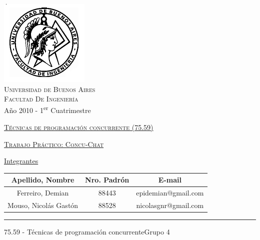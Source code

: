 \documentclass[12pt,titlepage]{article}
\begin{document}
\begin{titlepage}

\thispagestyle{empty}

\begin{center}
\includegraphics[scale=0.55]{./Images/fiuba}\\
\large{\textsc{Universidad de Buenos Aires}}\\
\large{\textsc{Facultad De Ingeniería}}\\
\small{Año 2010 - 1\textsuperscript{er} Cuatrimestre}
\end{center}

\vfill

\begin{center}

\Large{\underline{\textsc{Técnicas de programación concurrente (75.59)}}}

\vfill


\Large{\underline{\textsc{Trabajo Práctico: Concu-Chat}}}

\vfill
 
\Large\underline{Integrantes} \linebreak\linebreak

\large\addtolength{\tabcolsep}{-3pt}
\begin{tabular}{|| c | c | c ||}
\hline
\textbf{Apellido, Nombre} & \textbf{Nro. Padrón} & \textbf{E-mail} \\
\hline
Ferreiro, Demian & 88443 & epidemian@gmail.com \\
\hline
Mouso, Nicolás Gastón & 88528 & nicolasgnr@gmail.com \\
\hline
\end{tabular}
\end{center}

\vfill

\hrule
\vspace{0.2cm}

\noindent\small{75.59 - Técnicas de programación concurrente\hfill Grupo 4}

\end{titlepage}
\end{document}
